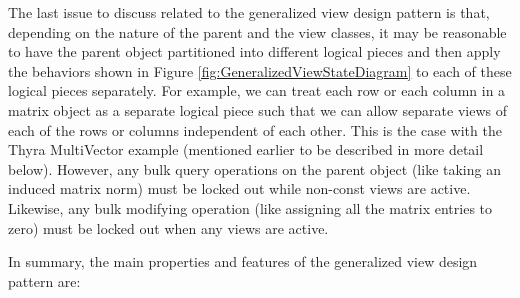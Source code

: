 \documentclass[pdf,ps2pdf,11pt]{SANDreport}
\begin{document}
The last issue to discuss related to the generalized view design
pattern is that, depending on the nature of the parent and the view
classes, it may be reasonable to have the parent object partitioned
into different logical pieces and then apply the behaviors shown in
Figure {}\ref{fig:GeneralizedViewStateDiagram} to each of these
logical pieces separately.  For example, we can treat each row or each
column in a matrix object as a separate logical piece such that we can
allow separate views of each of the rows or columns independent of
each other.  This is the case with the Thyra MultiVector example
(mentioned earlier to be described in more detail below).  However,
any bulk query operations on the parent object (like taking an induced
matrix norm) must be locked out while non-const views are active.
Likewise, any bulk modifying operation (like assigning all the matrix
entries to zero) must be locked out when any views are active.

In summary, the main properties and features of the generalized view
design pattern are:
\end{document}
